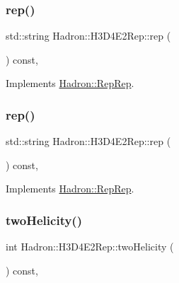 \subsubsection{\texorpdfstring{rep()}{rep()}\hspace{0.1cm}{\footnotesize\ttfamily [2/3]}}
{\footnotesize\ttfamily std\+::string Hadron\+::\+H3\+D4\+E2\+Rep\+::rep (\begin{DoxyParamCaption}{ }\end{DoxyParamCaption}) const\hspace{0.3cm}{\ttfamily [inline]}, {\ttfamily [virtual]}}



Implements \mbox{\hyperlink{structHadron_1_1RepRep_ab3213025f6de249f7095892109575fde}{Hadron\+::\+Rep\+Rep}}.

\mbox{\label{structHadron_1_1H3D4E2Rep_ab0cffc17ffd30d135328751bad30c549}} 
\subsubsection{\texorpdfstring{rep()}{rep()}\hspace{0.1cm}{\footnotesize\ttfamily [3/3]}}
{\footnotesize\ttfamily std\+::string Hadron\+::\+H3\+D4\+E2\+Rep\+::rep (\begin{DoxyParamCaption}{ }\end{DoxyParamCaption}) const\hspace{0.3cm}{\ttfamily [inline]}, {\ttfamily [virtual]}}



Implements \mbox{\hyperlink{structHadron_1_1RepRep_ab3213025f6de249f7095892109575fde}{Hadron\+::\+Rep\+Rep}}.

\mbox{\label{structHadron_1_1H3D4E2Rep_ae31f919f05b46798018cf3eb99816051}} 
\subsubsection{\texorpdfstring{twoHelicity()}{twoHelicity()}\hspace{0.1cm}{\footnotesize\ttfamily [1/2]}}
{\footnotesize\ttfamily int Hadron\+::\+H3\+D4\+E2\+Rep\+::two\+Helicity (\begin{DoxyParamCaption}{ }\end{DoxyParamCaption}) const\hspace{0.3cm}{\ttfamily [inline]}, {\ttfamily [virtual]}}


